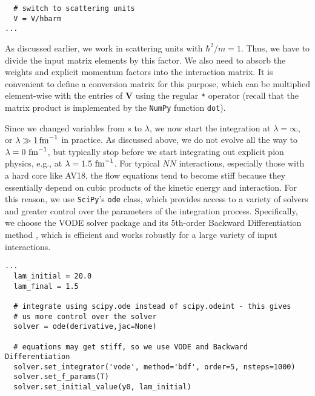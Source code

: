 {\begin{lstlisting}
  # switch to scattering units
  V = V/hbarm
...
\end{lstlisting}

As discussed earlier, we work in scattering units with $\hbar^2/m=1$. Thus,
we have to divide the input matrix elements by this factor. We also need to
absorb the weights and explicit momentum factors into the interaction matrix.
It is convenient to define a conversion matrix for this purpose, which can
be multiplied element-wise with the entries of $\mathbf{V}$ using the 
regular \texttt{*} operator (recall that the matrix product is implemented
by the \texttt{NumPy} function \texttt{dot}).


Since we changed variables from $s$ to $\lambda$, we now start the
integration at $\lambda=\infty$, or $\lambda\gg 1\,\text{fm}^{-1}$ in practice.
As discussed above, we do not evolve all the way to $\lambda=0\,\,\text{fm}^{-1}$,
but typically stop before we start integrating out explicit pion
physics, e.g., at $\lambda=1.5\,\,\text{fm}^{-1}$. For typical $NN$ interactions,
especially those with a hard core like AV18, the flow equations tend
to become stiff because they essentially depend on cubic products of
the kinetic energy and interaction. For this reason, we use \texttt{SciPy}'s
\texttt{ode} class, which provides access to a variety of solvers
and greater control over the parameters of the integration process.
Specifically, we choose the VODE solver package and its 5th-order 
Backward Differentiation method \cite{Brown:1989wj}, which is 
efficient and works robustly for a large variety of input interactions.

\begin{lstlisting}
...
  lam_initial = 20.0
  lam_final = 1.5

  # integrate using scipy.ode instead of scipy.odeint - this gives
  # us more control over the solver
  solver = ode(derivative,jac=None)

  # equations may get stiff, so we use VODE and Backward Differentiation
  solver.set_integrator('vode', method='bdf', order=5, nsteps=1000)
  solver.set_f_params(T)
  solver.set_initial_value(y0, lam_initial)


\end{lstlisting}}
